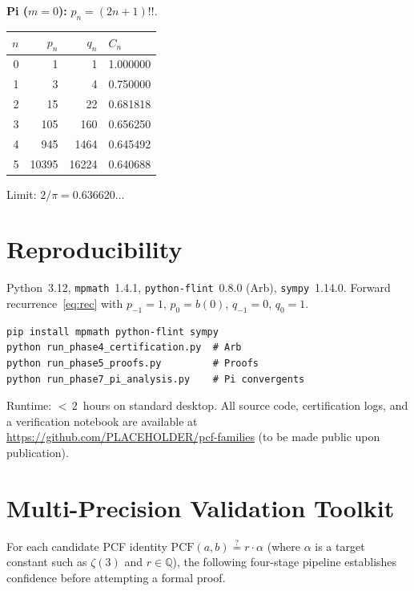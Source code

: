 \documentclass[11pt,a4paper]{article}
\theoremstyle{plain}
\theoremstyle{remark}
\newcommand{\PCF}{\mathrm{PCF}}
\begin{document}
\medskip
\textbf{Pi ($m{=}0$):} $p_n = (2n{+}1)!!$.

\smallskip
\begin{center}
\begin{tabular}{@{}rrrl@{}}
\toprule
$n$ & $p_n$ & $q_n$ & $C_n$ \\
\midrule
0 & 1 & 1 & 1.000000 \\
1 & 3 & 4 & 0.750000 \\
2 & 15 & 22 & 0.681818 \\
3 & 105 & 160 & 0.656250 \\
4 & 945 & 1464 & 0.645492 \\
5 & 10395 & 16224 & 0.640688 \\
\bottomrule
\end{tabular}
\end{center}
\smallskip\noindent Limit: $2/\pi = 0.636620\ldots$

\section{Reproducibility}\label{app:repro}

Python~3.12, \texttt{mpmath}~1.4.1, \texttt{python-flint}~0.8.0 (Arb),
\texttt{sympy}~1.14.0.
Forward recurrence~\eqref{eq:rec} with $p_{-1}{=}1$, $p_0{=}b(0)$,
$q_{-1}{=}0$, $q_0{=}1$.

\begin{verbatim}
pip install mpmath python-flint sympy
python run_phase4_certification.py  # Arb
python run_phase5_proofs.py         # Proofs
python run_phase7_pi_analysis.py    # Pi convergents
\end{verbatim}

\noindent Runtime: ${<}\,2$~hours on standard desktop.
All source code, certification logs, and a verification notebook
are available at \url{https://github.com/PLACEHOLDER/pcf-families}
(to be made public upon publication).

\section{Multi-Precision Validation Toolkit}\label{app:toolkit}

For each candidate PCF identity $\PCF(a,b) \stackrel{?}{=} r\cdot\alpha$
(where $\alpha$ is a target constant such as $\zeta(3)$ and $r\in\mathbb{Q}$),
the following four-stage pipeline establishes confidence before
attempting a formal proof.
\end{document}
